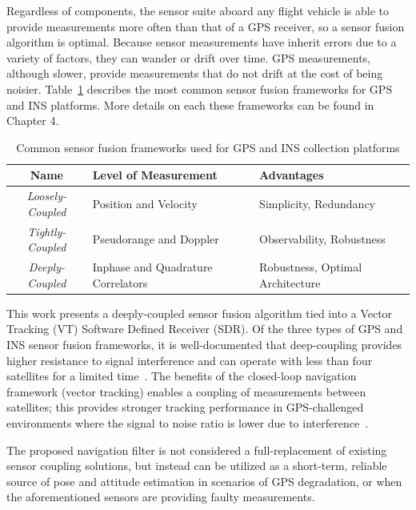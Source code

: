 Regardless of components, the sensor suite aboard any flight vehicle is able to provide measurements more often than that of a GPS receiver, so a sensor fusion algorithm is optimal. Because sensor measurements have inherit errors due to a variety of factors, they can wander or drift over time. GPS measurements, although slower, provide measurements that do not drift at the cost of being noisier. Table~\ref{tbl:sensorfusionframeworks} describes the most common sensor fusion frameworks for GPS and INS platforms. More details on each these frameworks can be found in Chapter 4.
\begin{table}[!ht]
    \caption{Common sensor fusion frameworks used for GPS and INS collection platforms}\label{tbl:sensorfusionframeworks}
    \centering
    \begin{tabular}{cll}
        \toprule
        \textbf{Name}            & \textbf{Level of Measurement}      & \textbf{Advantages}              \\
        \midrule
        \textit{Loosely-Coupled} & Position and Velocity              & Simplicity, Redundancy           \\
        \textit{Tightly-Coupled} & Pseudorange and Doppler            & Observability, Robustness        \\
        \textit{Deeply-Coupled}  & Inphase and Quadrature Correlators & Robustness, Optimal Architecture \\
        \bottomrule
    \end{tabular}
\end{table}

This work presents a deeply-coupled sensor fusion algorithm tied into a Vector Tracking (VT) Software Defined Receiver (SDR). Of the three types of GPS and INS sensor fusion frameworks, it is well-documented that deep-coupling provides higher resistance to signal interference and can operate with less than four satellites for a limited time~\cite{wattsGPSGLONASSL12019}. The benefits of the closed-loop navigation framework (vector tracking) enables a coupling of measurements between satellites; this provides stronger tracking performance in GPS-challenged environments where the signal to noise ratio is lower due to interference~\cite{grierPositionNavigationTiming}.

The proposed navigation filter is not considered a full-replacement of existing sensor coupling solutions, but instead can be utilized as a short-term, reliable source of pose and attitude estimation in scenarios of GPS degradation, or when the aforementioned sensors are providing faulty measurements.

